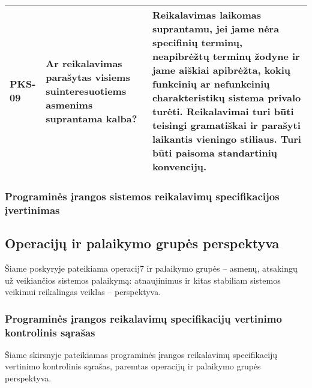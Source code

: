 \documentclass{VUMIFPSkursinis}
\begin{document}
\begin{center}
\begin{longtable}{|C{2cm}|L{5cm}|L{8cm}|}
		PKS-09                                                                        &
		Ar reikalavimas parašytas visiems suinteresuotiems asmenims suprantama kalba? &
		Reikalavimas laikomas suprantamu, jei jame nėra specifinių terminų, neapibrėžtų terminų žodyne ir jame aiškiai apibrėžta, kokių funkcinių ar nefunkcinių charakteristikų sistema privalo turėti. Reikalavimai turi būti teisingi gramatiškai ir parašyti laikantis vieningo stiliaus. Turi būti paisoma standartinių konvencijų.                                                                                                              \\ \hline
	\end{longtable}
\end{center}

\subsubsection{Programinės įrangos sistemos reikalavimų specifikacijos įvertinimas}

\subsection{Operacijų ir palaikymo grupės perspektyva}

Šiame poskyryje pateikiama operacij7 ir palaikymo grupės -- asmenų, atsakingų už veikiančios
sistemos palaikymą: atnaujinimus ir kitas stabiliam sistemos veikimui reikalingas veiklas -- perspektyva.

\subsubsection{Programinės įrangos reikalavimų specifikacijų vertinimo kontrolinis sąrašas}

Šiame skirsnyje pateikiamas programinės įrangos reikalavimų specifikacijų vertinimo kontrolinis sąrašas,
paremtas operacijų ir palaikymo grupės perspektyva.
\end{document}
